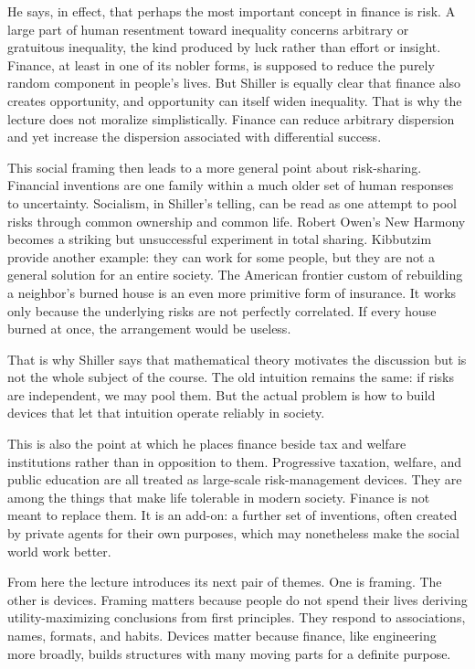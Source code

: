 He says, in effect, that perhaps the most important concept in finance is risk. A large part of human resentment toward inequality concerns arbitrary or gratuitous inequality, the kind produced by luck rather than effort or insight. Finance, at least in one of its nobler forms, is supposed to reduce the purely random component in people's lives. But Shiller is equally clear that finance also creates opportunity, and opportunity can itself widen inequality. That is why the lecture does not moralize simplistically. Finance can reduce arbitrary dispersion and yet increase the dispersion associated with differential success.

This social framing then leads to a more general point about risk-sharing. Financial inventions are one family within a much older set of human responses to uncertainty. Socialism, in Shiller's telling, can be read as one attempt to pool risks through common ownership and common life. Robert Owen's New Harmony becomes a striking but unsuccessful experiment in total sharing. Kibbutzim provide another example: they can work for some people, but they are not a general solution for an entire society. The American frontier custom of rebuilding a neighbor's burned house is an even more primitive form of insurance. It works only because the underlying risks are not perfectly correlated. If every house burned at once, the arrangement would be useless.

That is why Shiller says that mathematical theory motivates the discussion but is not the whole subject of the course. The old intuition remains the same: if risks are independent, we may pool them. But the actual problem is how to build devices that let that intuition operate reliably in society.

This is also the point at which he places finance beside tax and welfare institutions rather than in opposition to them. Progressive taxation, welfare, and public education are all treated as large-scale risk-management devices. They are among the things that make life tolerable in modern society. Finance is not meant to replace them. It is an add-on: a further set of inventions, often created by private agents for their own purposes, which may nonetheless make the social world work better.

From here the lecture introduces its next pair of themes. One is framing. The other is devices. Framing matters because people do not spend their lives deriving utility-maximizing conclusions from first principles. They respond to associations, names, formats, and habits. Devices matter because finance, like engineering more broadly, builds structures with many moving parts for a definite purpose.

